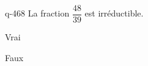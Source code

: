 \begin{truefalse}{q-468}
La fraction $\dfrac{48}{39}$ est irréductible.
\item Vrai
\item* Faux
\end{truefalse}

